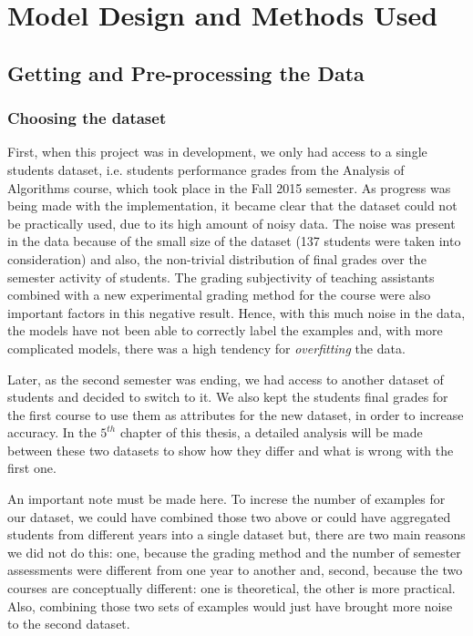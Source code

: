 \chapter{Model Design and Methods Used}

\section{Getting and Pre-processing the Data}

\subsection{Choosing the dataset}

First, when this project was in development, we only had access to a 
single students dataset, i.e. students performance grades from the 
Analysis of Algorithms course, which took place in the Fall 2015 semester. 
As progress was being made with the implementation, it became clear that the 
dataset could not be practically used, due to its high amount of noisy data. 
The noise was present in the data because of the small size of the 
dataset (137 students were taken into consideration) and also, 
the non-trivial distribution of final grades over the semester activity of students. 
The grading subjectivity of teaching assistants combined with a new 
experimental grading method for the course were also important factors in 
this negative result. Hence, with this much noise in the data, the models 
have not been able to correctly label the examples and, with more complicated 
models, there was a high tendency for {\it overfitting} the data. 

Later, as the second semester was ending, we had 
access to another dataset of students and decided to switch to it. We also 
kept the students final grades for the first course to use them as attributes 
for the new dataset, in order to increase accuracy. In the $5^{th}$ 
chapter of this thesis, a detailed analysis will be made between these two 
datasets to show how they differ and what is wrong with the first one.

An important note must be made here. To increse the number of examples for 
our dataset, we could have combined those two above or could have aggregated 
students from different years into a single dataset but, there are two main 
reasons we did not do this: one, because the grading method and the number 
of semester assessments were different from one year to another and, second, 
because the two courses are conceptually different: one is theoretical, the other 
is more practical. Also, combining those two sets of examples would just have brought 
more noise to the second dataset. 

